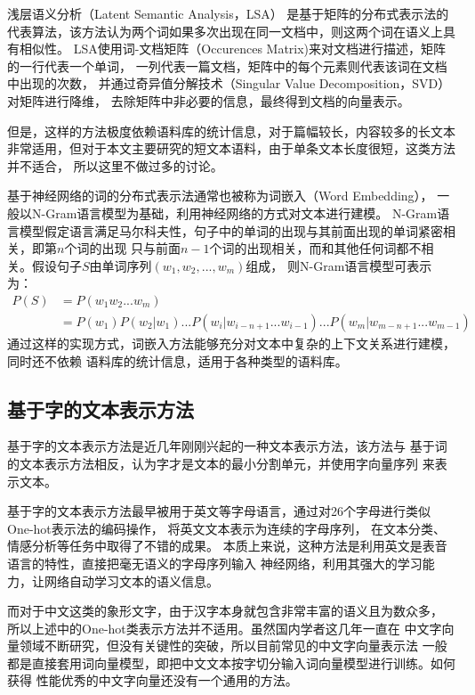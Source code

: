 浅层语义分析（Latent Semantic Analysis，LSA）
是基于矩阵的分布式表示法的
代表算法，该方法认为两个词如果多次出现在同一文档中，则这两个词在语义上具有相似性。
LSA使用词-文档矩阵（Occurences Matrix)来对文档进行描述，矩阵的一行代表一个单词，
一列代表一篇文档，矩阵中的每个元素则代表该词在文档中出现的次数，
并通过奇异值分解技术（Singular Value Decomposition，SVD）对矩阵进行降维，
去除矩阵中非必要的信息，最终得到文档的向量表示。

但是，这样的方法极度依赖语料库的统计信息，对于篇幅较长，内容较多的长文本
非常适用，但对于本文主要研究的短文本语料，由于单条文本长度很短，这类方法并不适合，
所以这里不做过多的讨论。

基于神经网络的词的分布式表示法通常也被称为词嵌入（Word Embedding），
一般以N-Gram语言模型为基础，利用神经网络的方式对文本进行建模。
N-Gram语言模型假定语言满足马尔科夫性，句子中的单词的出现与其前面出现的单词紧密相关，即第$n$个词的出现
只与前面$n-1$个词的出现相关，而和其他任何词都不相关。假设句子$S$由单词序列$\left (w_1,w_2,...,w_m  \right )$组成，
则N-Gram语言模型可表示为：
\begin{equation}
    \begin{aligned}
        P\left ( S \right )&=P\left ( w_1w_2...w_m \right )\\
        &=P\left ( w_1 \right )P\left ( w_2|w_1 \right )...
P\left ( w_i|w_{i-n+1}...w_{i-1} \right )...P\left ( w_m|w_{m-n+1}...w_{m-1} \right )
    \end{aligned}
    \label{n-gram}
\end{equation}
通过这样的实现方式，词嵌入方法能够充分对文本中复杂的上下文关系进行建模，同时还不依赖
语料库的统计信息，适用于各种类型的语料库。

\subsection{基于字的文本表示方法}
\label{char_rep}
基于字的文本表示方法是近几年刚刚兴起的一种文本表示方法，该方法与
基于词的文本表示方法相反，认为字才是文本的最小分割单元，并使用字向量序列
来表示文本。

基于字的文本表示方法最早被用于英文等字母语言，通过对26个字母进行类似One-hot表示法的编码操作，
将英文文本表示为连续的字母序列，
在文本分类、情感分析等任务中取得了不错的成果。
本质上来说，这种方法是利用英文是表音语言的特性，直接把毫无语义的字母序列输入
神经网络，利用其强大的学习能力，让网络自动学习文本的语义信息。

而对于中文这类的象形文字，由于汉字本身就包含非常丰富的语义且为数众多，
所以上述中的One-hot类表示方法并不适用。虽然国内学者这几年一直在
中文字向量领域不断研究，但没有关键性的突破，所以目前常见的中文字向量表示法
一般都是直接套用词向量模型，即把中文文本按字切分输入词向量模型进行训练。如何获得
性能优秀的中文字向量还没有一个通用的方法。

